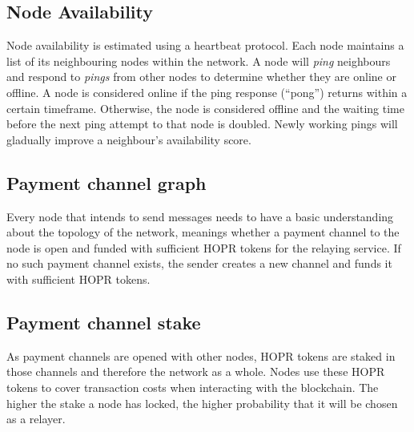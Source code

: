 \subsection{Node Availability}
\label{sec:nodeavailability}

Node availability is estimated using a heartbeat protocol. Each node maintains a
list of its neighbouring nodes within the network. A node will \textit{ping} neighbours and
respond to \textit{pings} from other nodes to determine whether they are online or offline.
A node is considered online if the ping response (``pong”) returns within a
certain timeframe. Otherwise, the node is considered offline and the waiting
time before the next ping attempt to that node is doubled. Newly working pings will gladually improve a
neighbour's availability score.
\subsection{Payment channel graph}
Every node that intends to send messages needs to have a basic understanding
about the topology of the network, meanings whether a payment channel to the node is open and
funded with sufficient HOPR tokens for the relaying service. If no such
payment channel exists, the sender creates a new channel and funds it with
sufficient HOPR tokens.
\subsection{Payment channel stake}
As payment channels are opened with other nodes, HOPR tokens are staked in those channels and therefore the network as a whole. Nodes use these HOPR
tokens to cover transaction costs when interacting with the blockchain. The higher
the stake a node has locked, the higher probability that it will be chosen as a relayer.
